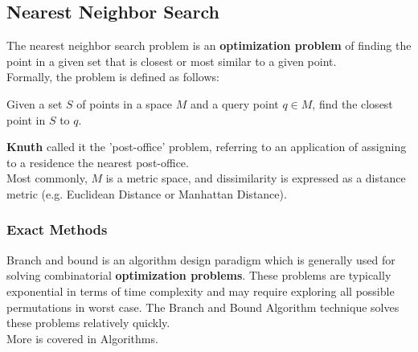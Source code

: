 \documentclass[english, 10pt]{article}
\begin{document}
\subsection{Nearest Neighbor Search}

The nearest neighbor search problem is an \textbf{optimization problem} of finding the point in a given set that is closest or most similar to a given point.\\

Formally, the problem is defined as follows:\\

\begin{myproof}
Given a set $S$ of points in a space $M$ and a query point $q \in M$, find the closest point in $S$ to $q$.
\end{myproof}

\textbf{Knuth} called it the 'post-office' problem, referring to an application of assigning to a residence the nearest post-office.\\

Most commonly, $M$ is a metric space, and dissimilarity is expressed as a distance metric (e.g. Euclidean Distance or Manhattan Distance).

\subsubsection{Exact Methods}

\hfill

\begin{tcolorbox}[title=Aside: Branch and Bound Paradigm,colframe=black,colback=white,arc=0pt,fonttitle=\bfseries]

Branch and bound is an algorithm design paradigm which is generally used for solving combinatorial \textbf{optimization problems}. These problems are typically exponential in terms of time complexity and may require exploring all possible permutations in worst case. The Branch and Bound Algorithm technique solves these problems relatively quickly.\\

More is covered in Algorithms.

\end{tcolorbox}

\hfill
\end{document}
